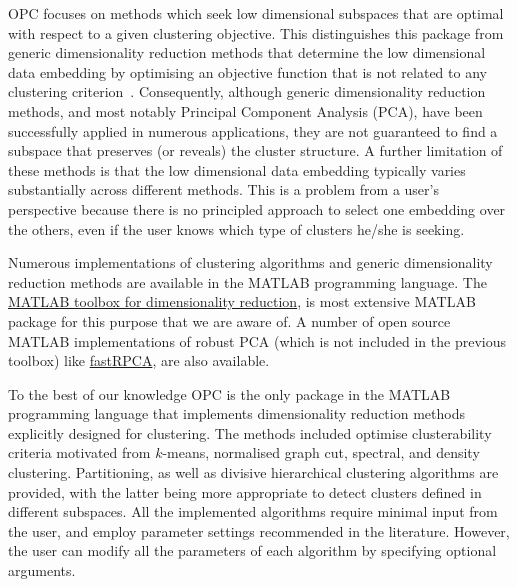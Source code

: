 \documentclass{book}
\begin{document}
OPC focuses on methods which seek low dimensional subspaces that are optimal
with respect to a given clustering objective.
%
This distinguishes this package from generic dimensionality reduction methods
%
that determine the low dimensional data embedding by optimising an objective
function that is not related to any clustering criterion~\cite{MaatenPH2009}. 
%
Consequently, although generic dimensionality reduction methods, and most
notably Principal Component Analysis (PCA), have been successfully applied in
numerous applications, they are not guaranteed to find a subspace that
preserves (or reveals) the cluster structure. 
%
A further limitation of these methods is that the low dimensional data
embedding typically varies substantially across different methods. This is a
problem from a user's perspective because there is no principled approach to
select one embedding over the others, even if the user knows which type of
clusters he/she is seeking.
%


Numerous implementations of clustering algorithms and generic dimensionality
reduction methods are available in the MATLAB programming language.
%
The 
%
\href{https://lvdmaaten.github.io/drtoolbox/}{MATLAB toolbox for dimensionality reduction}, 
%
is most extensive MATLAB package for this purpose that we are aware of.
%
A number of open source MATLAB implementations of robust PCA (which is not included
in the previous toolbox)
like
%
\href{https://github.com/stephenbeckr/fastRPCA}{fastRPCA},
%
are also available.


To the best of our knowledge OPC is the only package in the MATLAB programming
language that implements dimensionality reduction methods explicitly designed
for clustering.
%
The methods included optimise clusterability criteria motivated from $k$-means,
normalised graph cut, spectral, and density clustering.
%
Partitioning, as well as divisive hierarchical clustering algorithms are
provided, with the latter being more appropriate to detect clusters defined in
different subspaces.
%
All the implemented algorithms require minimal input from the user, and employ
parameter settings recommended in the literature. However, the user can modify
all the parameters of each algorithm by specifying optional arguments.
\end{document}

